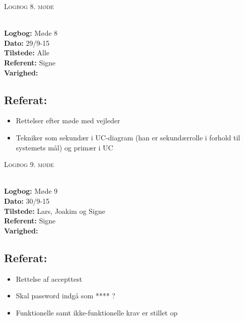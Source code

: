 \documentclass[a4paper,11pt,oneside]{memoir}
\begin{document}
\newpage


\begin{center} 
\huge{\textsc{Logbog 8. møde}}
\end{center}

\textbf{ }
\\
\textbf{Logbog:} Møde 8
\\
\textbf{Dato:} 29/9-15
\\
\textbf{Tilstede:} Alle
\\
\textbf{Referent:} Signe
\\
\textbf{Varighed:} 
\\

\subsection{Referat:}
\begin{itemize}
\item Rettelser efter møde med vejleder
\item Tekniker som sekundær i UC-diagram (han er sekundærrolle i forhold til systemets mål) og primær i UC 
\end{itemize}

\newpage


\begin{center} 
\huge{\textsc{Logbog 9. møde}}
\end{center}

\textbf{ }
\\
\textbf{Logbog:} Møde 9
\\
\textbf{Dato:} 30/9-15
\\
\textbf{Tilstede:} Lars, Joakim og Signe
\\
\textbf{Referent:} Signe
\\
\textbf{Varighed:} 
\\

\subsection{Referat:}
\begin{itemize}
\item Rettelse af accepttest
\item Skal password indgå som **** ?
\item Funktionelle samt ikke-funktionelle krav er stillet op
\end{itemize}
\end{document}
